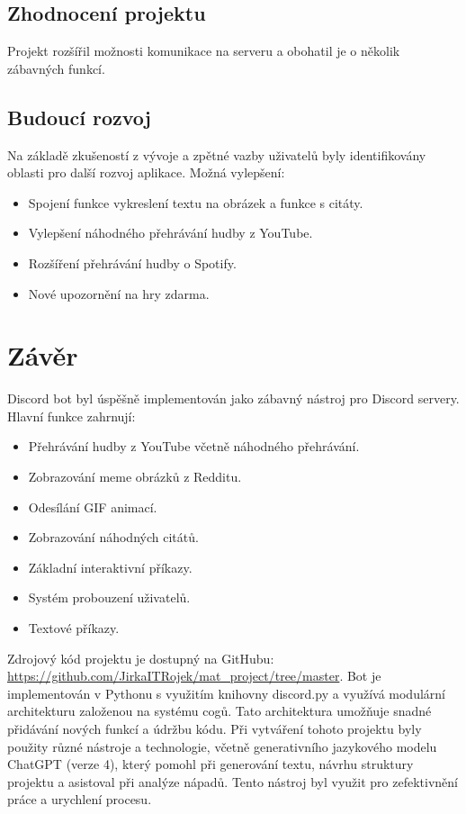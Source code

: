 \documentclass[12pt, a4paper]{report}
\begin{document}
\section{Zhodnocení projektu}
Projekt rozšířil možnosti komunikace na serveru a obohatil je o několik zábavných funkcí.
\section{Budoucí rozvoj}
Na základě zkušeností z vývoje a zpětné vazby uživatelů byly identifikovány oblasti pro další rozvoj aplikace.
Možná vylepšení:
\begin{itemize}
    \item Spojení funkce vykreslení textu na obrázek a funkce s citáty.
    \item Vylepšení náhodného přehrávání hudby z YouTube.
    \item Rozšíření přehrávání hudby o Spotify.
    \item Nové upozornění na hry zdarma.
\end{itemize}
\chapter{Závěr}
Discord bot byl úspěšně implementován jako zábavný nástroj pro Discord servery. Hlavní funkce zahrnují:
\begin{itemize}
    \item Přehrávání hudby z YouTube včetně náhodného přehrávání.
    \item Zobrazování meme obrázků z Redditu.
    \item Odesílání GIF animací.
    \item Zobrazování náhodných citátů.
    \item Základní interaktivní příkazy.
    \item Systém probouzení uživatelů.
    \item Textové příkazy.
\end{itemize}
Zdrojový kód projektu je dostupný na GitHubu: \newline
\href{https://github.com/JirkaITRojek/mat_project/tree/master}{https://github.com/JirkaITRojek/mat_project/tree/master}.
Bot je implementován v Pythonu s využitím knihovny discord.py a využívá modulární architekturu založenou na systému cogů. Tato architektura umožňuje snadné přidávání nových funkcí a údržbu kódu.
Při vytváření tohoto projektu byly použity různé nástroje a technologie, včetně generativního jazykového modelu ChatGPT (verze 4), který pomohl při generování textu, návrhu struktury projektu a asistoval při analýze nápadů. Tento nástroj byl využit pro zefektivnění práce a urychlení procesu.
\end{document}
